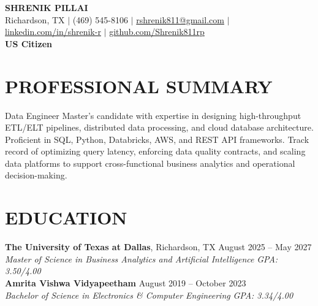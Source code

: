 \documentclass[11pt,letterpaper]{article}
\begin{document}
\begin{center}
{\LARGE \textbf{SHRENIK PILLAI}} \\ \vspace{2pt}
\small Richardson, TX $|$ (469) 545-8106 $|$ \href{mailto:rshrenik811@gmail.com}{rshrenik811@gmail.com} $|$ \href{https://linkedin.com/in/shrenik-r}{linkedin.com/in/shrenik-r} $|$ \href{https://github.com/Shrenik811rp}{github.com/Shrenik811rp} \\ \vspace{1pt}
\small \textbf{US Citizen}
\end{center}
\section*{PROFESSIONAL SUMMARY}
\noindent\small Data Engineer Master's candidate with expertise in designing high-throughput ETL/ELT pipelines, distributed data processing, and cloud database architecture. Proficient in SQL, Python, Databricks, AWS, and REST API frameworks. Track record of optimizing query latency, enforcing data quality contracts, and scaling data platforms to support cross-functional business analytics and operational decision-making.
\section*{EDUCATION}
\noindent\small \textbf{The University of Texas at Dallas}, Richardson, TX \hfill August 2025 -- May 2027 \\
\textit{Master of Science in Business Analytics and Artificial Intelligence} \hfill \textit{GPA: 3.50/4.00} \\
\noindent\small \textbf{Amrita Vishwa Vidyapeetham} \hfill August 2019 -- October 2023 \\
\textit{Bachelor of Science in Electronics \& Computer Engineering} \hfill \textit{GPA: 3.34/4.00}
\end{document}

